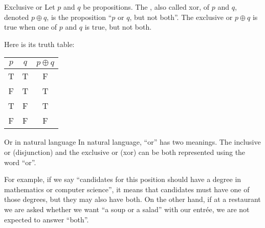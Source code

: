\documentclass{article}
\begin{document}
\begin{parag}{Exclusive or}
    Let $p$ and $q$ be propositions. The , also called xor, of $p$ and $q$, denoted $p \oplus q$, is the proposition ``$p$ or $q$, but not both''. The exclusive or $p \oplus q$ is true when one of $p$ and $q$ is true, but not both.

    Here is its truth table:
    \begin{center}
    \begin{tabular}{cc|c}
        $p$ & $q$ & $p \oplus q$ \\
        \hline
        T & T & F \\
        F & T & T \\
        T & F & T \\
        F & F & F
    \end{tabular}
    \end{center}
\end{parag}

\begin{parag}{Or in natural language}
    In natural language, ``or'' has two meanings. The inclusive or (disjunction) and the exclusive or (xor) can be both represented using the word ``or''.

    For example, if we say ``candidates for this position should have a degree in mathematics or computer science'', it means that candidates must have one of those degrees, but they may also have both. On the other hand, if at a restaurant we are asked whether we want ``a soup or a salad'' with our entrée, we are not expected to answer ``both''.
\end{parag}
\end{document}
